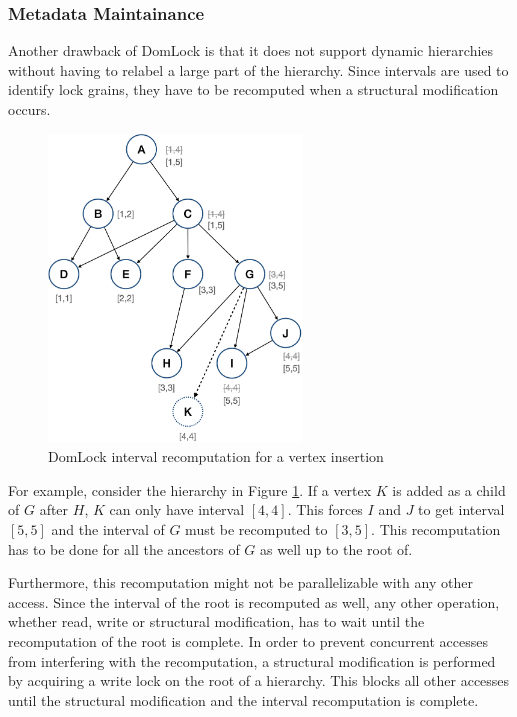 \subsubsection{Metadata Maintainance}

Another drawback of DomLock is that it does not support dynamic hierarchies without having to relabel a large part of the hierarchy.
Since intervals are used to identify lock grains, they have to be recomputed when a structural modification occurs.

\begin{figure}[h]
    \centering
    \captionsetup{justification=centering}
    \includegraphics[width=0.6\textwidth]{figures/domlock_example_with_SM.png}
    \caption{DomLock interval recomputation for a vertex insertion}
    \label{fig:domlock_example_SM}
\end{figure}

For example, consider the hierarchy in Figure \ref{fig:domlock_example_SM}. If a vertex $K$ is added as a child of $G$ after $H$, $K$ can only have interval $[4,4]$. This forces $I$ and $J$ to get interval $[5,5]$ and the interval of $G$ must be recomputed to $[3,5]$. This recomputation has to be done for all the ancestors of $G$ as well up to the root of. 

Furthermore, this recomputation might not be parallelizable with any other access. Since the interval of the root is recomputed as well, any other operation, whether read, write or structural modification, has to wait until the recomputation of the root is complete. 
In order to prevent concurrent accesses from interfering with the recomputation, a structural modification is performed by acquiring a write lock on the root of a hierarchy. This blocks all other accesses until the structural modification and the interval recomputation is complete. 

